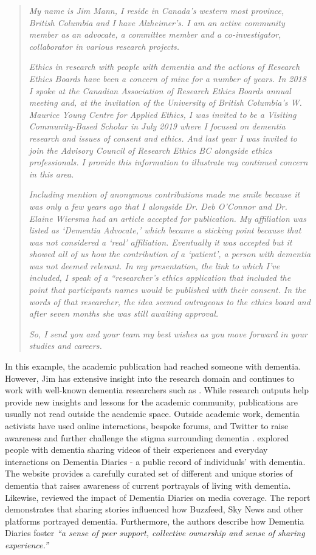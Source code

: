 \begin{quote}
\textit{My name is Jim Mann, I reside in Canada’s western most province, British Columbia and I have Alzheimer's. I am an active community member as an advocate, a committee member and a co-investigator, collaborator in various research projects.} 

\textit{Ethics in research with people with dementia and the actions of Research Ethics Boards have been a concern of mine for a number of years. In 2018 I spoke at the Canadian Association of Research Ethics Boards annual meeting and, at the invitation of the University of British Columbia’s W. Maurice Young Centre for Applied Ethics, I was invited to be a Visiting Community-Based Scholar in July 2019 where I focused on dementia research and issues of consent and ethics. And last year I was invited to join the Advisory Council of Research Ethics BC alongside ethics professionals. I provide this information to illustrate my continued concern in this area.
} 

\textit{Including mention of anonymous contributions made me smile because it was only a few years ago that I alongside Dr. Deb O’Connor and Dr. Elaine Wiersma had an article accepted for publication. My affiliation was listed as ‘Dementia Advocate,’ which became a sticking point because that was not considered a ‘real’ affiliation. Eventually it was accepted but it showed all of us how the contribution of a ‘patient’, a person with dementia was not deemed relevant. In my presentation, the link to which I’ve included, I speak of a “researcher’s ethics application that included the point that participants names would be published with their consent. In the words of that researcher, the idea seemed outrageous to the ethics board and after seven months she was still awaiting approval.
} 

\textit{So, I send you and your team my best wishes as you move forward in your studies and careers.
}
\end{quote}
In this example, the academic publication had reached someone with dementia. However, Jim has extensive insight into the research domain and continues to work with well-known dementia researchers such as \cite{bartlett2010broadening}. While research outputs help provide new insights and lessons for the academic community, publications are usually not read outside the academic space. Outside academic work, dementia activists have used online interactions, bespoke forums, and Twitter to raise awareness and further challenge the stigma surrounding dementia \citep{talbot_how_2020}. \cite{lazar_safe_2019} explored people with dementia sharing videos of their experiences and everyday interactions on Dementia Diaries - a public record of individuals' with dementia. The website provides a carefully curated set of different and unique stories of dementia that raises awareness of current portrayals of living with dementia. Likewise, \cite{woodall2016independent} reviewed the impact of Dementia Diaries on media coverage. The report demonstrates that sharing stories influenced how Buzzfeed, Sky News and other platforms portrayed dementia. Furthermore, the authors describe how Dementia Diaries foster \textit{``a sense of peer support, collective ownership and sense of sharing experience.''}

